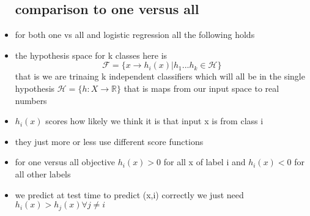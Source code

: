 \documentclass{article}
\begin{document}
\begin{itemize}
\subsection*{comparison to one versus all}
\item for both one vs all and logistic regression all the following holds
\item the hypothesis space for k classes here is $$\mathcal{F}=\{x\rightarrow h_i(x)|h_1...h_k\in \mathcal{H}\}$$ that is we are trinaing 
k independent classifiers which will all be in the single hypothesis $\mathcal{H}=\{h:X\rightarrow\mathbb{R}\}$ that is maps from our input space to real numbers 
\item $h_i(x)$ scores how likely we think it is that input x is from class i 
\item they just more or less use different score functions
\item for one versus all objective $h_i(x)>0$ for all x of label i and $h_i(x)<0$ for all other labels
\item we predict at test time to predict (x,i) correctly we just need $h_{i}(x)>h_{j}(x)\forall j\neq i$

\end{itemize}
\end{document}
